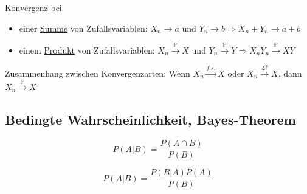 Konvergenz bei
\begin{itemize}
    \item einer \underline{Summe} von Zufallsvariablen: \(X_n \rightarrow a\) und \(Y_n \rightarrow b \Longrightarrow X_n + Y_n \rightarrow a + b\)
    \item einem \underline{Produkt} von Zufallsvariablen: \(X_n \xrightarrow{\mathbb{P}} X\) und \(Y_n \xrightarrow{\mathbb{P}} Y \Longrightarrow X_nY_n \xrightarrow{\mathbb{P}} XY\)
\end{itemize}

Zusammenhang zwischen Konvergenzarten: Wenn \(X_n \xrightarrow{f.s.} X\) oder \(X_n \xrightarrow{\mathcal{L}^p} X\), dann \(X_n \xrightarrow{\mathbb{P}} X\)


\subsection{Bedingte Wahrscheinlichkeit, Bayes-Theorem}

\begin{minipage}{0.50\textwidth}
    \begin{equation*}
        P(A|B)=\frac{P(A\cap B)}{P(B)}
    \end{equation*}
\end{minipage}
\hspace{1cm}
\begin{minipage}{0.50\textwidth}
    \begin{equation*}
        P(A|B)=\frac{P(B|A)P(A)}{P(B)}
    \end{equation*}
\end{minipage}

